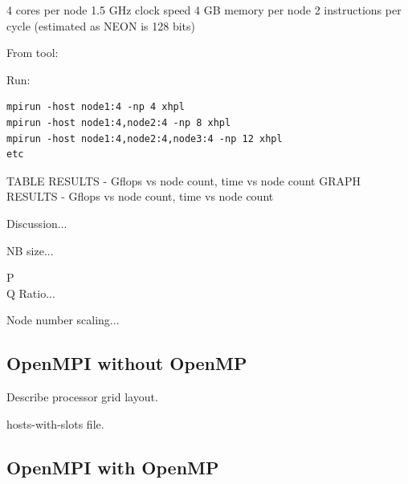 \documentclass{article}
\begin{document}
4 cores per node
1.5 GHz clock speed
4 GB memory per node
2 instructions per cycle (estimated as NEON is 128 bits)

From tool:


Run:

\begin{verbatim}
mpirun -host node1:4 -np 4 xhpl
mpirun -host node1:4,node2:4 -np 8 xhpl
mpirun -host node1:4,node2:4,node3:4 -np 12 xhpl
etc
\end{verbatim}

TABLE RESULTS - Gflops vs node count, time vs node count
GRAPH RESULTS - Gflops vs node count, time vs node count

Discussion...

NB size...

P\\Q Ratio...

Node number scaling...


\subsection{OpenMPI without OpenMP}

Describe processor grid layout.

hosts-with-slots file.

\subsection{OpenMPI with OpenMP}
\end{document}
